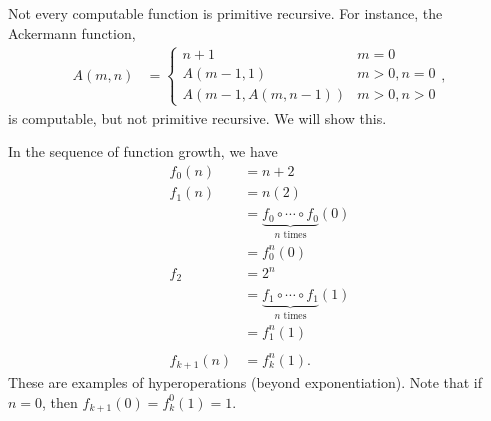 \documentclass[10pt]{mypackage}
\begin{document}
\begin{example}
Not every computable function is primitive recursive. For instance, the Ackermann function,
\begin{align*}
  A\left(m,n\right) &= \begin{cases}
    n+1 & m=0\\
    A\left(m-1,1\right) & m > 0,n = 0\\
    A\left(m-1,A\left(m,n-1\right)\right) & m > 0,n > 0
  \end{cases},
\end{align*}
is computable, but not primitive recursive. We will show this.\newline

In the sequence of function growth, we have
\begin{align*}
  f_{0}\left(n\right) &= n+2\\
  f_1\left(n\right) &= n\left(2\right)\\
                    &= \underbrace{f_{0}\circ\cdots\circ f_{0}}_{\text{$n$ times}}(0)\\
                    &= f_0^{n}(0)\\
  f_2 &= 2^{n}\\
      &= \underbrace{f_{1}\circ\cdots\circ f_{1}}_{\text{$n$ times}}(1)\\
      &= f_{1}^{n}\left(1\right)\\
      \\
  f_{k+1}(n) &= f_{k}^{n}(1).\tag*{(\textasteriskcentered)}
\end{align*}
These are examples of hyperoperations (beyond exponentiation). Note that if $n=0$, then $f_{k+1}(0) = f_{k}^{0}(1) = 1$.\newline


\end{example}
\end{document}

